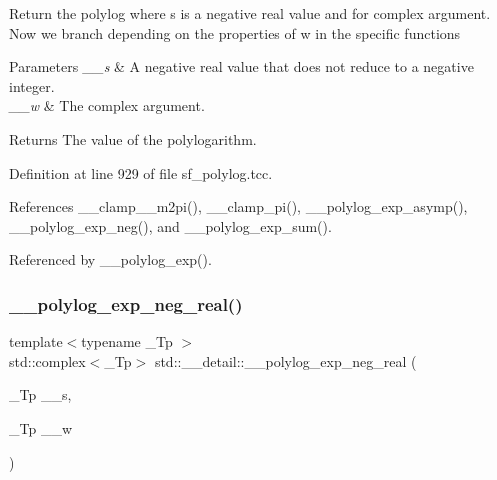 Return the polylog where s is a negative real value and for complex argument. Now we branch depending on the properties of w in the specific functions


\begin{DoxyParams}{Parameters}
{\em \+\_\+\+\_\+s} & A negative real value that does not reduce to a negative integer. \\
\hline
{\em \+\_\+\+\_\+w} & The complex argument. \\
\hline
\end{DoxyParams}
\begin{DoxyReturn}{Returns}
The value of the polylogarithm. 
\end{DoxyReturn}


Definition at line 929 of file sf\+\_\+polylog.\+tcc.



References \+\_\+\+\_\+clamp\+\_\+\_\+m2pi(), \+\_\+\+\_\+clamp\+\_\+pi(), \+\_\+\+\_\+polylog\+\_\+exp\+\_\+asymp(), \+\_\+\+\_\+polylog\+\_\+exp\+\_\+neg(), and \+\_\+\+\_\+polylog\+\_\+exp\+\_\+sum().



Referenced by \+\_\+\+\_\+polylog\+\_\+exp().

\mbox{\label{namespacestd_1_1____detail_a65df07847bbb3c92518449fbc5787870}} 
\subsubsection{\texorpdfstring{\+\_\+\+\_\+polylog\+\_\+exp\+\_\+neg\+\_\+real()}{\_\_polylog\_exp\_neg\_real()}\hspace{0.1cm}{\footnotesize\ttfamily [2/2]}}
{\footnotesize\ttfamily template$<$typename \+\_\+\+Tp $>$ \\
std\+::complex$<$\+\_\+\+Tp$>$ std\+::\+\_\+\+\_\+detail\+::\+\_\+\+\_\+polylog\+\_\+exp\+\_\+neg\+\_\+real (\begin{DoxyParamCaption}\item[{\+\_\+\+Tp}]{\+\_\+\+\_\+s,  }\item[{\+\_\+\+Tp}]{\+\_\+\+\_\+w }\end{DoxyParamCaption})}


